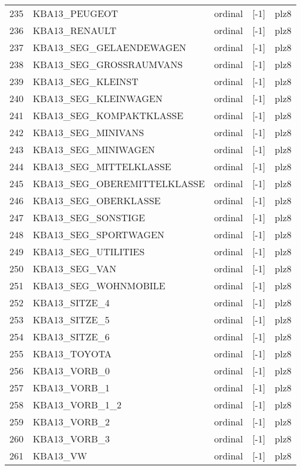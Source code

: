 \begin{longtable}{lllll}
235 &    KBA13\_PEUGEOT &  ordinal &   [-1] &  plz8 \\
236 &    KBA13\_RENAULT &  ordinal &   [-1] &  plz8 \\
237 &  KBA13\_SEG\_GELAENDEWAGEN &  ordinal &   [-1] &  plz8 \\
238 &  KBA13\_SEG\_GROSSRAUMVANS &  ordinal &   [-1] &  plz8 \\
239 &    KBA13\_SEG\_KLEINST &  ordinal &   [-1] &  plz8 \\
240 & KBA13\_SEG\_KLEINWAGEN &  ordinal &   [-1] &  plz8 \\
241 &  KBA13\_SEG\_KOMPAKTKLASSE &  ordinal &   [-1] &  plz8 \\
242 &   KBA13\_SEG\_MINIVANS &  ordinal &   [-1] &  plz8 \\
243 &  KBA13\_SEG\_MINIWAGEN &  ordinal &   [-1] &  plz8 \\
244 &   KBA13\_SEG\_MITTELKLASSE &  ordinal &   [-1] &  plz8 \\
245 &  KBA13\_SEG\_OBEREMITTELKLASSE &  ordinal &   [-1] &  plz8 \\
246 & KBA13\_SEG\_OBERKLASSE &  ordinal &   [-1] &  plz8 \\
247 &   KBA13\_SEG\_SONSTIGE &  ordinal &   [-1] &  plz8 \\
248 & KBA13\_SEG\_SPORTWAGEN &  ordinal &   [-1] &  plz8 \\
249 &  KBA13\_SEG\_UTILITIES &  ordinal &   [-1] &  plz8 \\
250 &    KBA13\_SEG\_VAN &  ordinal &   [-1] &  plz8 \\
251 & KBA13\_SEG\_WOHNMOBILE &  ordinal &   [-1] &  plz8 \\
252 &    KBA13\_SITZE\_4 &  ordinal &   [-1] &  plz8 \\
253 &    KBA13\_SITZE\_5 &  ordinal &   [-1] &  plz8 \\
254 &    KBA13\_SITZE\_6 &  ordinal &   [-1] &  plz8 \\
255 &     KBA13\_TOYOTA &  ordinal &   [-1] &  plz8 \\
256 &     KBA13\_VORB\_0 &  ordinal &   [-1] &  plz8 \\
257 &     KBA13\_VORB\_1 &  ordinal &   [-1] &  plz8 \\
258 &   KBA13\_VORB\_1\_2 &  ordinal &   [-1] &  plz8 \\
259 &     KBA13\_VORB\_2 &  ordinal &   [-1] &  plz8 \\
260 &     KBA13\_VORB\_3 &  ordinal &   [-1] &  plz8 \\
261 &  KBA13\_VW &  ordinal &   [-1] &  plz8 \\

\end{longtable}
